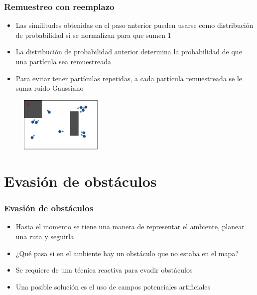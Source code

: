 \begin{frame}\frametitle{Remuestreo con reemplazo}
  \begin{itemize}
  \item Las similitudes obtenidas en el paso anterior pueden usarse como distribución de probabilidad si se normalizan para que sumen 1
  \item La distribución de probabilidad anterior determina la probabilidad de que una partícula sea remuestreada
  \item Para evitar tener partículas repetidas, a cada partícula remuestreada se le suma ruido Gaussiano
  \end{itemize}
  \begin{figure}
    \centering
    \includegraphics[width=0.35\textwidth]{Figures/MotionPlanning/ParticleFilter5.pdf}
  \end{figure}
\end{frame}

\section{Evasión de obstáculos}
\begin{frame}\frametitle{Evasión de obstáculos}
  \begin{itemize}
  \item Hasta el momento se tiene una manera de representar el ambiente, planear una ruta y seguirla
  \item ¿Qué pasa si en el ambiente hay un obstáculo que no estaba en el mapa?
  \item Se requiere de una técnica reactiva para evadir obstáculos
  \item Una posible solución es el uso de campos potenciales artificiales
  \end{itemize}
\end{frame}

